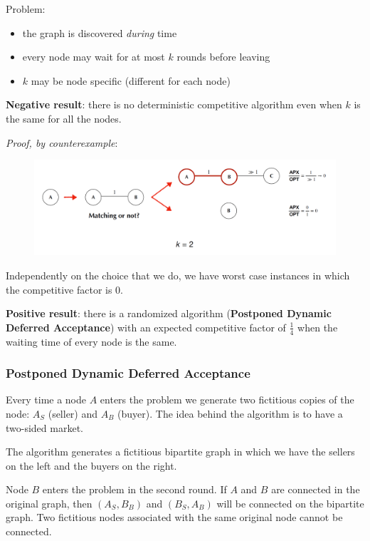 \documentclass[10pt,a4paper]{article}
\begin{document}
Problem:

\begin{itemize}

\item the graph is discovered \textit{during} time
\item every node may wait for at most $k$ rounds before leaving
\item $k$ may be node specific (different for each node)
\end{itemize}

\textbf{Negative result}: there is no deterministic competitive algorithm even when $k$ is the same for all the nodes.

\textit{Proof, by counterexample}:

\begin{figure}[htbp]
\centering
\includegraphics[width=\textwidth]{images/img_01.png}
\end{figure}

Independently on the choice that we do, we have worst case instances in which the competitive factor is 0.

\textbf{Positive result}: there is a randomized algorithm (\textbf{Postponed Dynamic Deferred Acceptance}) with an expected competitive factor of $\frac{1}{4}$ when the waiting time of every node is the same.

\subsubsection{Postponed Dynamic Deferred Acceptance}\label{postponed-dynamic-deferred-acceptance}

Every time a node $A$ enters the problem we generate two fictitious copies of the node: $A_S$ (seller) and $A_B$ (buyer). The idea behind the algorithm is to have a two-sided market.

The algorithm generates a fictitious bipartite graph in which we have the sellers on the left and the buyers on the right.

Node $B$ enters the problem in the second round. If $A$ and $B$ are connected in the original graph, then $(A_S, B_B)$ and $(B_S, A_B)$ will be connected on the bipartite graph. Two fictitious nodes associated with the same original node cannot be connected.
\end{document}
